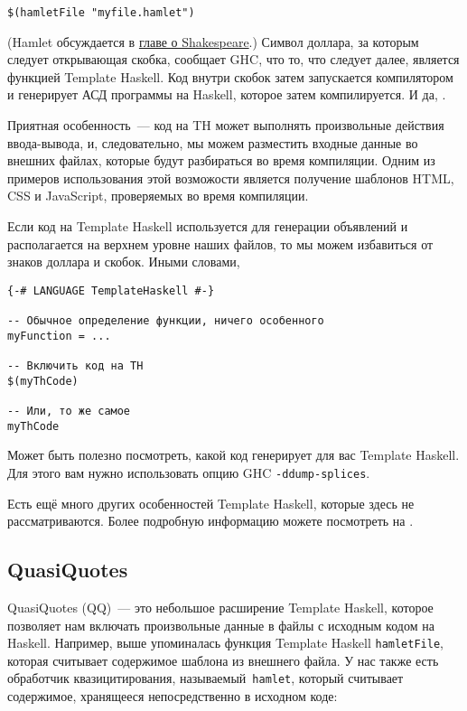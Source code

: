 \begin{lstlisting}
$(hamletFile "myfile.hamlet")
\end{lstlisting}

(Hamlet обсуждается в \hyperref[chap:shakespeare]{главе о Shakespeare}.) Символ доллара, за которым следует открывающая скобка, сообщает GHC, что то, что следует далее, является функцией Template Haskell. Код внутри скобок затем запускается компилятором и генерирует АСД программы на Haskell, которое затем компилируется. И да, .

Приятная особенность~--- код на TH может выполнять произвольные действия ввода-вывода, и, следовательно, мы можем разместить входные данные во внешних файлах, которые будут разбираться во время компиляции. Одним из примеров использования этой возможости является получение шаблонов HTML, CSS и JavaScript, проверяемых во время компиляции.

Если код на Template Haskell используется для генерации объявлений и располагается на верхнем уровне наших файлов, то мы можем избавиться от знаков доллара и скобок. Иными словами,

\begin{lstlisting}
{-# LANGUAGE TemplateHaskell #-}

-- Обычное определение функции, ничего особенного
myFunction = ...

-- Включить код на TH
$(myThCode)

-- Или, то же самое
myThCode
\end{lstlisting}

Может быть полезно посмотреть, какой код генерирует для вас Template Haskell. Для этого вам нужно использовать опцию GHC \texttt{-ddump-splices}.

\begin{remark}
Есть ещё много других особенностей Template Haskell, которые здесь не рассматриваются. Более подробную информацию можете посмотреть на .
\end{remark}

\subsection{QuasiQuotes}

QuasiQuotes (QQ)~--- это небольшое расширение Template Haskell, которое позволяет нам включать произвольные данные в файлы с исходным кодом на Haskell. Например, выше упоминалась функция Template Haskell \lstinline'hamletFile', которая считывает содержимое шаблона из внешнего файла. У нас также есть обработчик квазицитирования, называемый~\lstinline'hamlet', который считывает содержимое, хранящееся непосредственно в исходном коде:

